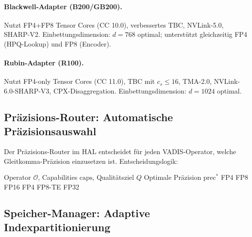 ﻿\documentclass[12pt,a4paper]{article}
\begin{document}
\paragraph{Blackwell-Adapter (B200/GB200).}
Nutzt FP4+FP8 Tensor Cores (CC 10.0), verbes\-sertes TBC,
NVLink-5.0, SHARP-V2. Einbettungsdimension: $d = 768$ optimal;
unterstützt gleichzeitig FP4 (HPQ-Lookup) und FP8 (Encoder).

\paragraph{Rubin-Adapter (R100).}
Nutzt FP4-only Tensor Cores (CC 11.0), TBC mit $c_s \leq 16$,
TMA-2.0, NVLink-6.0-SHARP-V3, CPX-Disaggregation.
Einbettungsdimension: $d = 1024$ optimal.

\subsection{Präzisions-Router: Automatische Präzisionsauswahl}
\label{sub:precision_router}

Der Präzisions-Router im HAL entscheidet für jeden VADIS-Operator,
welche Gleitkomma-Präzision einzusetzen ist. Entscheidungslogik:

\begin{algorithm}[ht]
\small
\caption{VADIS-Präzisions-Router}
\label{alg:prec_router}
\begin{algorithmic}[1]
\Require Operator $\mathcal{O}$, Capabilities $\text{caps}$, Qualitätsziel $Q$
\Ensure Optimale Präzision $\text{prec}^*$
    \Return FP4 \quad {}
    \Return FP8 \quad {}
  \Else
    \Return FP16
  \EndIf
{}
    \Return FP4 
    \Return FP8-TE 
  \EndIf
{}
  \Return FP32 \quad {}
\EndIf
\end{algorithmic}
\end{algorithm}

\subsection{Speicher-Manager: Adaptive Indexpartitionierung}
\label{sub:memory_manager}
\end{document}

